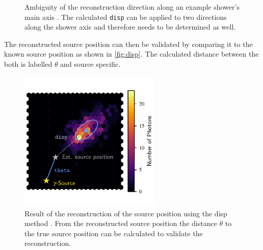 \begin{figure}
\begin{subfigure}{0.5\textwidth}
  \end{subfigure}
  \caption{Ambiguity of the reconstruction direction along an example shower's main axis \cite{maxhillas}. The calculated \texttt{disp} can be applied to two directions along the shower axis and therefore needs to be determined as well.}
  \label{fig:disp_amb}
\end{figure}
%
The reconstructed source position can then be validated by comparing it to the
known source position as shown in \autoref{fig:disp}. The calculated distance
between the both is labelled $\theta$ and source specific.
%
\begin{figure}
  \centering%
  \includegraphics[width=0.6\textwidth]{Plots/hillas_disp.pdf}%
  \caption{Result of the reconstruction of the source position using the disp method \cite{maxhillas}. From the reconstructed source position the distance $\theta$ to the true source position can be calculated to validate the reconstruction.}%
  \label{fig:disp}%
\end{figure}
%
